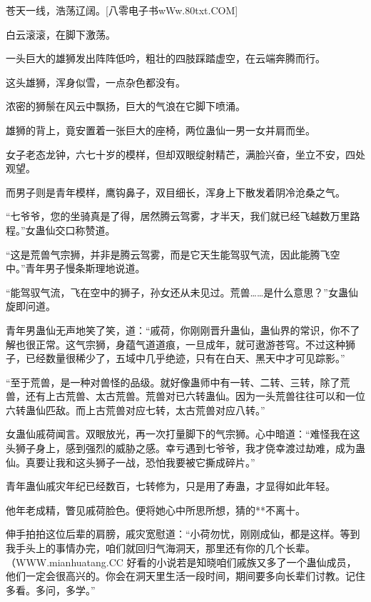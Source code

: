 
\begin{this_body}

苍天一线，浩荡辽阔。[八零电子书wWw.80txt.COM]

白云滚滚，在脚下激荡。

一头巨大的雄狮发出阵阵低吟，粗壮的四肢踩踏虚空，在云端奔腾而行。

这头雄狮，浑身似雪，一点杂色都没有。

浓密的狮鬃在风云中飘扬，巨大的气浪在它脚下喷涌。

雄狮的背上，竟安置着一张巨大的座椅，两位蛊仙一男一女并肩而坐。

女子老态龙钟，六七十岁的模样，但却双眼绽射精芒，满脸兴奋，坐立不安，四处观望。

而男子则是青年模样，鹰钩鼻子，双目细长，浑身上下散发着阴冷沧桑之气。

“七爷爷，您的坐骑真是了得，居然腾云驾雾，才半天，我们就已经飞越数万里路程。”女蛊仙交口称赞道。

“这是荒兽气宗狮，并非是腾云驾雾，而是它天生能驾驭气流，因此能腾飞空中。”青年男子慢条斯理地说道。

“能驾驭气流，飞在空中的狮子，孙女还从未见过。荒兽……是什么意思？”女蛊仙旋即问道。

青年男蛊仙无声地笑了笑，道：“戚荷，你刚刚晋升蛊仙，蛊仙界的常识，你不了解也很正常。这气宗狮，身蕴气道道痕，一旦成年，就可遨游苍穹。不过这种狮子，已经数量很稀少了，五域中几乎绝迹，只有在白天、黑天中才可见踪影。”

“至于荒兽，是一种对兽怪的品级。就好像蛊师中有一转、二转、三转，除了荒兽，还有上古荒兽、太古荒兽。荒兽对已六转蛊仙。因为一头荒兽往往可以和一位六转蛊仙匹敌。而上古荒兽对应七转，太古荒兽对应八转。”

女蛊仙戚荷闻言。双眼放光，再一次打量脚下的气宗狮。心中暗道：“难怪我在这头狮子身上，感到强烈的威胁之感。幸亏遇到七爷爷，我才侥幸渡过劫难，成为蛊仙。真要让我和这头狮子一战，恐怕我要被它撕成碎片。”

青年蛊仙戚灾年纪已经数百，七转修为，只是用了寿蛊，才显得如此年轻。

他年老成精，瞥见戚荷脸色。便将她心中所思所想，猜的**不离十。

伸手拍拍这位后辈的肩膀，戚灾宽慰道：“小荷勿忧，刚刚成仙，都是这样。等到我手头上的事情办完，咱们就回归气海洞天，那里还有你的几个长辈。（WWW.mianhuatang.CC 好看的小说若是知晓咱们戚族又多了一个蛊仙成员，他们一定会很高兴的。你会在洞天里生活一段时间，期间要多向长辈们讨教。记住多看。多问，多学。”


\end{this_body}
